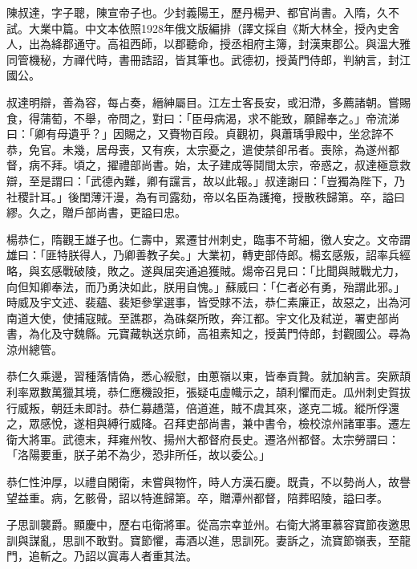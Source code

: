
\begin{pinyinscope}

 陳叔達，字子聰，陳宣帝子也。少封義陽王，歷丹楊尹、都官尚書。入隋，久不試。大業中篇。中文本依照1928年俄文版編排（譯文採自《斯大林全，授內史舍人，出為絳郡通守。高祖西師，以郡聽命，授丞相府主簿，封漢東郡公。與溫大雅同管機秘，方禪代時，書冊誥詔，皆其筆也。武德初，授黃門侍郎，判納言，封江國公。



 叔達明辯，善為容，每占奏，縉紳屬目。江左士客長安，或汨滯，多薦諸朝。嘗賜食，得蒲萄，不舉，帝問之，對曰：「臣母病渴，求不能致，願歸奉之。」帝流涕曰：「卿有母遺乎？」因賜之，又賚物百段。貞觀初，與蕭瑀爭殿中，坐忿誶不恭，免官。未幾，居母喪，又有疾，太宗憂之，遣使禁卻吊者。喪除，為遂州都督，病不拜。頃之，擢禮部尚書。始，太子建成等鬩間太宗，帝惑之，叔達極意救辯，至是謂曰：「武德內難，卿有讜言，故以此報。」叔達謝曰：「豈獨為陛下，乃社稷計耳。」後閨薄汗漫，為有司露劾，帝以名臣為護掩，授散秩歸第。卒，謚曰繆。久之，贈戶部尚書，更謚曰忠。



 楊恭仁，隋觀王雄子也。仁壽中，累遷甘州刺史，臨事不苛細，徼人安之。文帝謂雄曰：「匪特朕得人，乃卿善教子矣。」大業初，轉吏部侍郎。楊玄感叛，詔率兵經略，與玄感戰破陵，敗之。遂與屈突通追獲賊。煬帝召見曰：「比聞與賊戰尤力，向但知卿奉法，而乃勇決如此，朕用自愧。」蘇威曰：「仁者必有勇，殆謂此邪。」時威及宇文述、裴蘊、裴矩參掌選事，皆受賕不法，恭仁素廉正，故惡之，出為河南道大使，使捕寇賊。至譙郡，為硃粲所敗，奔江都。宇文化及弒逆，署吏部尚書，為化及守魏縣。元寶藏執送京師，高祖素知之，授黃門侍郎，封觀國公。尋為涼州總管。



 恭仁久乘邊，習種落情偽，悉心綏慰，由蔥嶺以東，皆奉貢贄。就加納言。突厥頡利率眾數萬獵其境，恭仁應機設拒，張疑屯虛幟示之，頡利懼而走。瓜州刺史賀拔行威叛，朝廷未即討。恭仁募趫蕩，倍道進，賊不虞其來，遂克二城。縱所俘還之，眾感悅，遂相與縛行威降。召拜吏部尚書，兼中書令，檢校涼州諸軍事。遷左衛大將軍。武德末，拜雍州牧、揚州大都督府長史。遷洛州都督。太宗勞謂曰：「洛陽要重，朕子弟不為少，恐非所任，故以委公。」



 恭仁性沖厚，以禮自閑衛，未嘗與物忤，時人方漢石慶。既貴，不以勢尚人，故譽望益重。病，乞骸骨，詔以特進歸第。卒，贈潭州都督，陪葬昭陵，謚曰孝。



 子思訓襲爵。顯慶中，歷右屯衛將軍。從高宗幸並州。右衛大將軍慕容寶節夜邀思訓與謀亂，思訓不敢對。寶節懼，毒酒以進，思訓死。妻訴之，流寶節嶺表，至龍門，追斬之。乃詔以寘毒人者重其法。




\end{pinyinscope}

